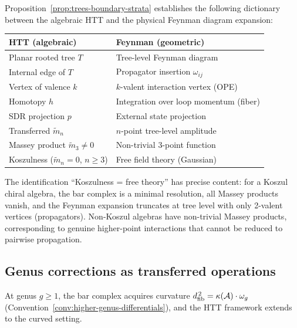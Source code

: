 \begin{remark}
\label{rem:feynman-htt}
Proposition~\ref{prop:trees-boundary-strata} establishes the following
dictionary between the algebraic HTT and the physical Feynman diagram
expansion:

\medskip
\begin{center}
\renewcommand{\arraystretch}{1.15}
\begin{tabular}{@{} l @{\;\;$\longleftrightarrow$\;\;} l @{}}
\toprule
\textbf{HTT (algebraic)} & \textbf{Feynman (geometric)} \\
\midrule
Planar rooted tree $T$ & Tree-level Feynman diagram \\
Internal edge of $T$ & Propagator insertion $\omega_{ij}$ \\
Vertex of valence $k$ & $k$-valent interaction vertex (OPE) \\
Homotopy $h$ & Integration over loop momentum (fiber) \\
SDR projection $p$ & External state projection \\
Transferred $\tilde{m}_n$ & $n$-point tree-level amplitude \\
Massey product $\tilde{m}_3 \neq 0$ & Non-trivial 3-point function \\
Koszulness ($\tilde{m}_n = 0$, $n \geq 3$) & Free field theory (Gaussian) \\
\bottomrule
\end{tabular}
\end{center}

\medskip
\noindent
The identification ``Koszulness = free theory'' has precise content:
for a Koszul chiral algebra, the bar complex is a minimal resolution,
all Massey products vanish, and the Feynman expansion truncates at
tree level with only 2-valent vertices (propagators).  Non-Koszul
algebras have non-trivial Massey products, corresponding to genuine
higher-point interactions that cannot be reduced to pairwise
propagation.
\end{remark}

\subsection{Genus corrections as transferred operations}
\label{subsec:genus-corrections-htt}

At genus $g \geq 1$, the bar complex acquires curvature
$d_{\mathrm{fib}}^{\,2} = \kappa(\mathcal{A}) \cdot \omega_g$
(Convention~\ref{conv:higher-genus-differentials}), and the
HTT framework extends to the curved setting.

